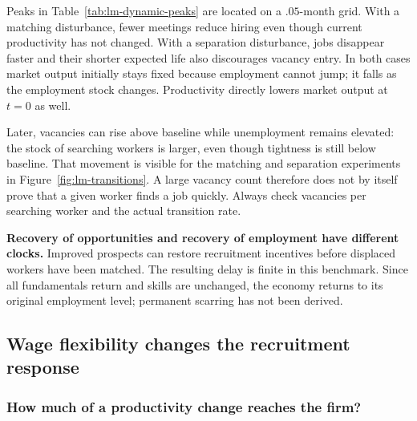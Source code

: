 Peaks in Table~\ref{tab:lm-dynamic-peaks} are located on a $.05$-month grid.
With a matching disturbance, fewer meetings reduce hiring even though current
productivity has not changed. With a separation disturbance, jobs disappear
faster and their shorter expected life also discourages vacancy entry. In
both cases market output initially stays fixed because employment cannot jump;
it falls as the employment stock changes. Productivity directly lowers market
output at $t=0$ as well.

Later, vacancies can rise above baseline while unemployment remains elevated:
the stock of searching workers is larger, even though tightness is still
below baseline. That movement is visible for the matching and separation
experiments in Figure~\ref{fig:lm-transitions}. A large vacancy count therefore
does not by itself prove that a given worker finds a job quickly. Always check
vacancies per searching worker and the actual transition rate.

\begin{greenblock}
\textbf{Recovery of opportunities and recovery of employment have different clocks.}
Improved prospects can restore recruitment incentives before displaced workers
have been matched. The resulting delay is finite in this benchmark. Since
all fundamentals return and skills are unchanged, the economy returns to its
original employment level; permanent scarring has not been derived.
\end{greenblock}

\subsection{Wage flexibility changes the recruitment response}

\subsubsection{How much of a productivity change reaches the firm?}

